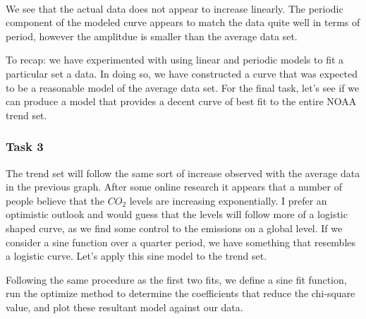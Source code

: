 \documentclass[11pt]{article}
\begin{document}
    \begin{center}
    \end{center}
    { \hspace*{\fill} \\}
    
    We see that the actual data does not appear to increase linearly. The
periodic component of the modeled curve appears to match the data quite
well in terms of period, however the amplitdue is smaller than the
average data set.

To recap: we have experimented with using linear and periodic models to
fit a particular set a data. In doing so, we have constructed a curve
that was expected to be a reasonable model of the average data set. For
the final task, let's see if we can produce a model that provides a
decent curve of best fit to the entire NOAA trend set.

\subsubsection{Task 3}\label{task-3}

The trend set will follow the same sort of increase observed with the
average data in the previous graph. After some online research it
appears that a number of people believe that the \(CO_2\) levels are
increasing exponentially. I prefer an optimistic outlook and would guess
that the levels will follow more of a logistic shaped curve, as we find
some control to the emissions on a global level. If we consider a sine
function over a quarter period, we have something that resembles a
logistic curve. Let's apply this sine model to the trend set.

Following the same procedure as the first two fits, we define a sine fit
function, run the optimize method to determine the coefficients that
reduce the chi-square value, and plot these resultant model against our
data.
\end{document}

